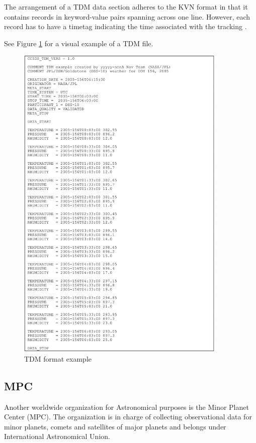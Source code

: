 	The arrangement of a TDM data section adheres to the KVN format in that it contains records in keyword-value pairs spanning across one line. However, each record has to have a timetag indicating the time associated with the tracking \citep{TDMdefinition}.
	
	See Figure \ref{fig:tdm_example} for a visual example of a TDM file.
	
	\begin{figure}[H]
	\centering
	  \includegraphics[width=10cm]{images/tdm_example}
		  \caption{TDM format example}
	  \label{fig:tdm_example}
	\end{figure}
		
\subsection{MPC}

	Another worldwide organization for Astronomical purposes is the Minor Planet Center (MPC). The organization is in charge of collecting observational data for minor planets, comets and satellites of major planets and belongs under International Astronomical Union.
	
